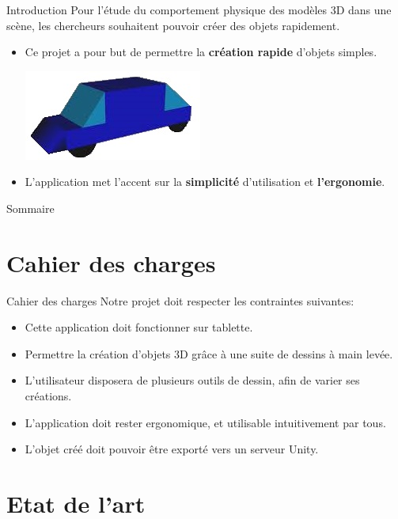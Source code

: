 \documentclass[a4paper,10pt]{beamer}
\begin{document}
	\begin{frame}{Introduction}
		Pour l'étude du comportement physique des modèles 3D dans une scène, les chercheurs souhaitent pouvoir créer des objets rapidement.
		
		
		\begin{itemize}
			\item Ce projet a pour but de permettre la \textbf{création rapide} d'objets simples.
			\centerline{\includegraphics[scale=0.5]{images/intro/car.jpg}}
			\item L'application met l'accent sur la \textbf{simplicité} d'utilisation et \textbf{l'ergonomie}.
		\end{itemize}
		
	\end{frame}
	
	\begin{frame}{Sommaire}
		\tableofcontents
	\end{frame}
	
	\section{Cahier des charges}
	
	\begin{frame}{Cahier des charges}
		Notre projet doit respecter les contraintes suivantes:
		\begin{itemize}
			\item Cette application doit fonctionner sur tablette.
			\item Permettre la création d'objets 3D grâce à une suite de dessins à main levée.
			\item L'utilisateur disposera de plusieurs outils de dessin, afin de varier ses créations.
			\item L'application doit rester ergonomique, et utilisable intuitivement par tous.
			\item L'objet créé doit pouvoir être exporté vers un serveur Unity.
		\end{itemize}
	\end{frame}
	
	\section{Etat de l'art}
	
\end{document}
